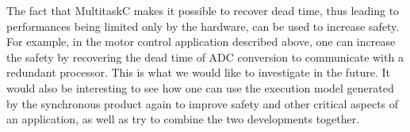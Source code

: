 \documentclass[10pt]{report}
\begin{document}
The fact that MultitaskC makes it possible to recover dead time, thus leading to performances being limited only by the hardware,
can be used to increase safety. For example, in the motor control application described above, one can increase the safety 
by recovering the dead time of ADC conversion to communicate with a redundant processor. This is what we would like to
investigate in the future. It would also be interesting to see how one can use the execution model generated by the synchronous product 
again to improve safety and other critical aspects of an application, as well as try to combine the two developments together. 


\scriptsize


\end{document}
